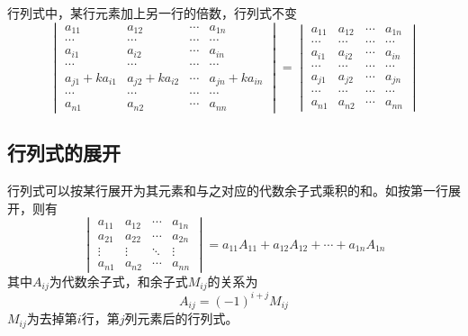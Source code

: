 \begin{property}
    行列式中，某行元素加上另一行的倍数，行列式不变
    \[
        \begin{vmatrix}
            a_{11}         & a_{12}         & \cdots & a_{1n}         \\
            \cdots         & \cdots         & \cdots & \cdots         \\
            a_{i1}         & a_{i2}         & \cdots & a_{in}         \\
            \cdots         & \cdots         & \cdots & \cdots         \\
            a_{j1}+ka_{i1} & a_{j2}+ka_{i2} & \cdots & a_{jn}+ka_{in} \\
            \cdots         & \cdots         & \cdots & \cdots         \\
            a_{n1}         & a_{n2}         & \cdots & a_{nn}
        \end{vmatrix}
        =
        \begin{vmatrix}
            a_{11} & a_{12} & \cdots & a_{1n} \\
            \cdots & \cdots & \cdots & \cdots \\
            a_{i1} & a_{i2} & \cdots & a_{in} \\
            \cdots & \cdots & \cdots & \cdots \\
            a_{j1} & a_{j2} & \cdots & a_{jn} \\
            \cdots & \cdots & \cdots & \cdots \\
            a_{n1} & a_{n2} & \cdots & a_{nn}
        \end{vmatrix}
    \]
\end{property}

\subsection{行列式的展开}
行列式可以按某行展开为其元素和与之对应的代数余子式乘积的和。如按第一行展开，则有
\[
    \begin{vmatrix}
        a_{11} & a_{12} & \cdots & a_{1n} \\
        a_{21} & a_{22} & \cdots & a_{2n} \\
        \vdots & \vdots & \ddots & \vdots \\
        a_{n1} & a_{n2} & \cdots & a_{nn}
    \end{vmatrix}
    =
    a_{11}A_{11} + a_{12}A_{12} + \cdots + a_{1n}A_{1n}
\]
其中$A_{ij}$为代数余子式，和余子式$M_{ij}$的关系为
\[ A_{ij} = (-1)^{i+j}M_{ij} \]
$M_{ij}$为去掉第$i$行，第$j$列元素后的行列式。

